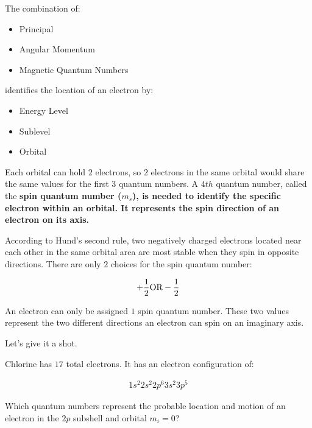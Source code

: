 \begin{definition}
    The combination of:
    
    \begin{itemize}
        \item Principal
        \item Angular Momentum
        \item Magnetic Quantum Numbers
    \end{itemize}
    
    identifies the location of an electron by:
    
    \begin{itemize}
        \item Energy Level
        \item Sublevel
        \item Orbital
    \end{itemize}
    
    Each orbital can hold $2$ electrons, so $2$ electrons in the same
    orbital would share the same values for the first $3$ quantum numbers. A
    $4th$ quantum number, called the \bf{spin quantum number} ($m_s$), is
    needed to identify the specific electron within an orbital. It represents
    the spin direction of an electron on its axis.

    According to Hund's second rule, two negatively charged electrons located
    near each other in the same orbital area are most stable when they spin in
    opposite directions. There are only $2$ choices for the spin quantum number:

    \begin{align}
        +\frac{1}{2} \rm{OR} -\frac{1}{2}
    \end{align}

    An electron can only be assigned $1$ spin quantum number. These two values
    represent the two different directions an electron can spin on an imaginary
    axis.

    Let's give it a shot.

    Chlorine has $17$ total electrons. It has an electron configuration of:
    
    \begin{align}
        1s^{2}2s^{2}2p^{6}3s^{2}3p^{5}
    \end{align}
    
    Which quantum numbers represent the probable location and
    motion of an electron in the $2p$ subshell and orbital $m_i = 0$?


\end{definition}
